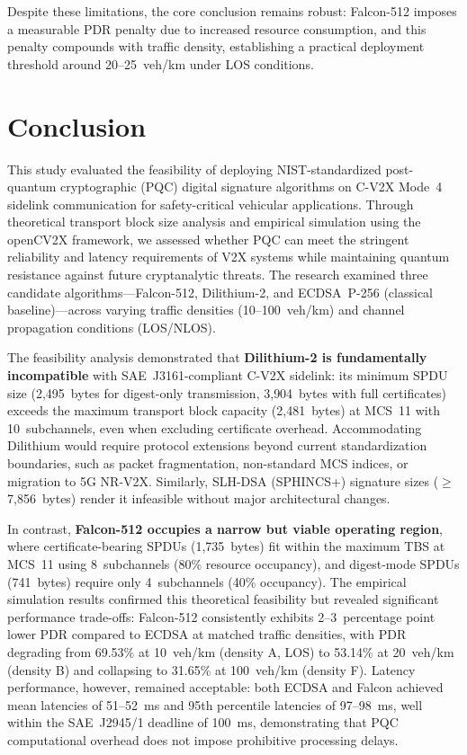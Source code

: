 \documentclass[letterpaper,journal]{IEEEtran}
\begin{document}
Despite these limitations, the core conclusion remains robust: Falcon-512 imposes a measurable PDR penalty due to increased resource consumption, and this penalty compounds with traffic density, establishing a practical deployment threshold around 20--25~veh/km under LOS conditions.

\section{Conclusion}
\label{sec:conclusion}

This study evaluated the feasibility of deploying NIST-standardized post-quantum cryptographic (PQC) digital signature algorithms on C-V2X Mode~4 sidelink communication for safety-critical vehicular applications. Through theoretical transport block size analysis and empirical simulation using the openCV2X framework, we assessed whether PQC can meet the stringent reliability and latency requirements of V2X systems while maintaining quantum resistance against future cryptanalytic threats. The research examined three candidate algorithms---Falcon-512, Dilithium-2, and ECDSA~P-256 (classical baseline)---across varying traffic densities (10--100~veh/km) and channel propagation conditions (LOS/NLOS).

The feasibility analysis demonstrated that \textbf{Dilithium-2 is fundamentally incompatible} with SAE~J3161-compliant C-V2X sidelink: its minimum SPDU size (2{,}495~bytes for digest-only transmission, 3{,}904~bytes with full certificates) exceeds the maximum transport block capacity (2{,}481~bytes) at MCS~11 with 10~subchannels, even when excluding certificate overhead. Accommodating Dilithium would require protocol extensions beyond current standardization boundaries, such as packet fragmentation, non-standard MCS indices, or migration to 5G NR-V2X. Similarly, SLH-DSA (SPHINCS+) signature sizes ($\geq$7{,}856~bytes) render it infeasible without major architectural changes.

In contrast, \textbf{Falcon-512 occupies a narrow but viable operating region}, where certificate-bearing SPDUs (1{,}735~bytes) fit within the maximum TBS at MCS~11 using 8~subchannels (80\% resource occupancy), and digest-mode SPDUs (741~bytes) require only 4~subchannels (40\% occupancy). The empirical simulation results confirmed this theoretical feasibility but revealed significant performance trade-offs: Falcon-512 consistently exhibits 2--3~percentage point lower PDR compared to ECDSA at matched traffic densities, with PDR degrading from 69.53\% at 10~veh/km (density A, LOS) to 53.14\% at 20~veh/km (density B) and collapsing to 31.65\% at 100~veh/km (density F). Latency performance, however, remained acceptable: both ECDSA and Falcon achieved mean latencies of 51--52~ms and 95th percentile latencies of 97--98~ms, well within the SAE~J2945/1 deadline of 100~ms, demonstrating that PQC computational overhead does not impose prohibitive processing delays.
\end{document}
